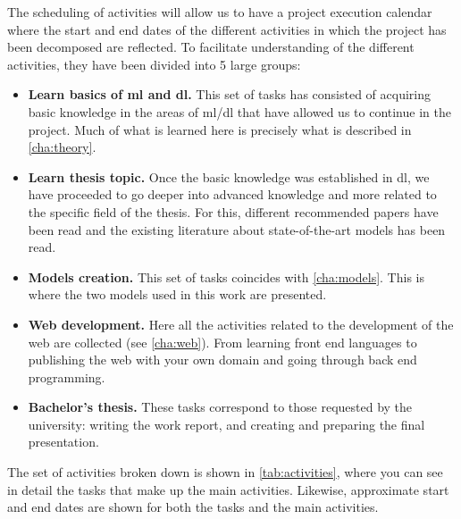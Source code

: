 The scheduling of activities will allow us to have a project execution calendar
where the start and end dates of the different activities in which the project
has been decomposed are reflected. To facilitate understanding of the different
activities, they have been divided into 5 large groups:
\begin{itemize}
  \item \textbf{Learn basics of \gls{ml} and \gls{dl}.} This set of tasks has
  consisted of acquiring basic knowledge in the areas of \gls{ml}/\gls{dl} that
  have allowed us to continue in the project. Much of what is learned here is
  precisely what is described in \vref{cha:theory}.
  \item \textbf{Learn thesis topic.} Once the basic knowledge was established
  in \gls{dl}, we have proceeded to go deeper into advanced knowledge and more
  related to the specific field of the thesis. For this, different recommended
  papers have been read and the existing literature about state-of-the-art
  models has been read.
  \item \textbf{Models creation.} This set of tasks coincides with
  \vref{cha:models}. This is where the two models used in this work are
  presented.
  \item \textbf{Web development.} Here all the activities related to the
  development of the web are collected (see \vref{cha:web}). From learning
  front end languages to publishing the web with your own domain and going
  through back end programming.
  \item \textbf{Bachelor's thesis.} These tasks correspond to those requested
  by the university: writing the work report, and creating and preparing the
  final presentation.
\end{itemize}

The set of activities broken down is shown in \vref{tab:activities}, where you
can see in detail the tasks that make up the main activities. Likewise,
approximate start and end dates are shown for both the tasks and the main
activities.

